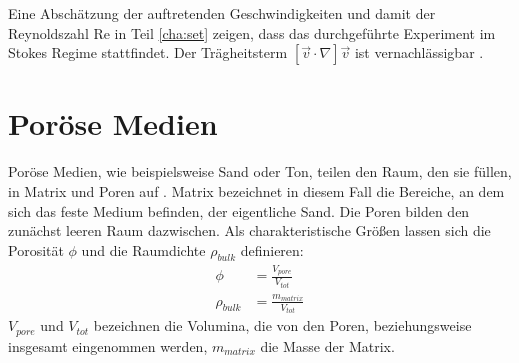 Eine Abschätzung der auftretenden Geschwindigkeiten und damit der Reynoldszahl Re in Teil \ref{cha:set} zeigen, dass das durchgeführte Experiment im Stokes Regime stattfindet. Der Trägheitsterm $\left[ \vec{v} \cdot \nabla \right] \vec{v}$  ist vernachlässigbar \citep{roth2005}.






\section{Poröse Medien}
\label{sec:por}

Poröse Medien, wie beispielsweise Sand oder Ton, teilen den Raum, den sie füllen, in Matrix und Poren auf \citep{roth2005}.  Matrix bezeichnet in diesem Fall die Bereiche, an dem sich das feste Medium befinden, der eigentliche Sand. Die Poren bilden den zunächst leeren Raum dazwischen.
Als charakteristische Größen lassen sich die Porosität $\phi$ und die Raumdichte $\rho_{bulk}$ definieren:
\begin{align}
 \phi &= \frac{V_{pore}}{V_{tot}} \\
 \rho_{bulk} &= \frac{m_{matrix}}{V_{tot}} %
\end{align}
$V_{pore}$ und $V_{tot}$ bezeichnen die Volumina, die von den Poren, beziehungsweise insgesamt eingenommen werden, $m_{matrix}$ die Masse der Matrix. 

